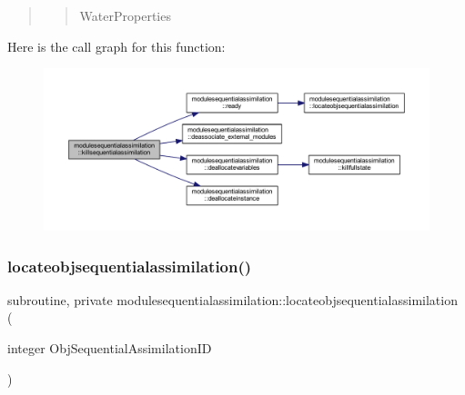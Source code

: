 \begin{quote}
\begin{quote}
Water\+Properties \end{quote}
\end{quote}
Here is the call graph for this function\+:\nopagebreak
\begin{figure}[H]
\begin{center}
\leavevmode
\includegraphics[width=350pt]{namespacemodulesequentialassimilation_a50ed5db30b7f431f2b333f7f86d5ef99_cgraph}
\end{center}
\end{figure}
\mbox{\label{namespacemodulesequentialassimilation_a1d6ec9ce245a5aa2d80e8f35b8142e21}} 
\subsubsection{\texorpdfstring{locateobjsequentialassimilation()}{locateobjsequentialassimilation()}}
{\footnotesize\ttfamily subroutine, private modulesequentialassimilation\+::locateobjsequentialassimilation (\begin{DoxyParamCaption}\item[{integer}]{Obj\+Sequential\+Assimilation\+ID }\end{DoxyParamCaption})\hspace{0.3cm}{\ttfamily [private]}}

